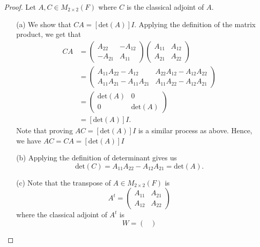 \begin{proof}
    Let \( A, C \in {M}_{2 \times 2}(F)  \)  where \( C  \) is the classical adjoint of \( A  \).
\begin{enumerate}
    \item[(a)] We show that \( CA = [\text{det}(A)]I  \). Applying the definition of the matrix product, we get that
        \begin{align*}
            CA &= \begin{pmatrix}
                {A}_{22} & - {A}_{12} \\
                -{A}_{21} & {A}_{11}
            \end{pmatrix} \begin{pmatrix} 
                {A}_{11} & {A}_{12} \\ 
                {A}_{21} & {A}_{22}
                      \end{pmatrix}  \\
               &= \begin{pmatrix}
                   {A}_{11}{A}_{22} - {A}_{12} & {A}_{22}{A}_{12} - {A}_{12}{A}_{22} \\
                   {A}_{11}{A}_{21} -{A}_{11}{A}_{21} & {A}_{11}{A}_{22} - {A}_{12}{A}_{21} 
               \end{pmatrix} \\
               &= \begin{pmatrix} 
                   \text{det}(A) & 0 \\
                   0 & \text{det}(A)
                         \end{pmatrix} \\
               &= [\text{det}(A)] I.
        \end{align*}
        Note that proving \( AC = [\text{det}(A)] I  \) is a similar process as above. Hence, we have \( AC = CA = [\text{det}(A)] I  \)
    \item[(b)] Applying the definition of determinant gives us
        \[  \text{det}(C) = {A}_{11}{A}_{22} - {A}_{12}{A}_{21} = \text{det}(A). \]
    \item[(c)] Note that the transpose of \( A \in {M}_{2 \times 2 }(F) \) is
        \[  A^{t} = \begin{pmatrix}
            {A}_{11} & {A}_{21} \\ 
            {A}_{12} & {A}_{22}
        \end{pmatrix} \]
        where the classical adjoint of \( A^{t}  \) is
        \[  W = \begin{pmatrix}

\end{pmatrix}\]
\end{enumerate}
\end{proof}
